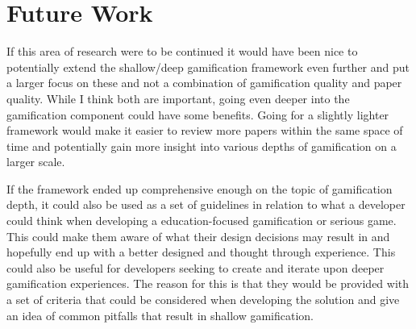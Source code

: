 \section{Future Work}
If this area of research were to be continued it would have been nice to potentially extend the shallow/deep gamification framework even further and put a larger focus on these and not a combination of gamification quality and paper quality. While I think both are important, going even deeper into the gamification component could have some benefits. Going for a slightly lighter framework would make it easier to review more papers within the same space of time and potentially gain more insight into various depths of gamification on a larger scale.  

If the framework ended up comprehensive enough on the topic of gamification depth, it could also be used as a set of guidelines in relation to what a developer could think when developing a education-focused gamification or serious game. This could make them aware of what their design decisions may result in and hopefully end up with a better designed and thought through experience. This could also be useful for developers seeking to create and iterate upon deeper gamification experiences. The reason for this is that they would be provided with a set of criteria that could be considered when developing the solution and give an idea of common pitfalls that result in shallow gamification. 
